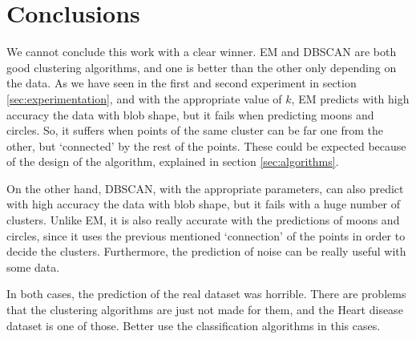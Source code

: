 \section{Conclusions}
We cannot conclude this work with a clear winner. EM and DBSCAN are both good clustering algorithms, and one is better than the other only depending on the data. 
As we have seen in the first and second experiment in section \ref{sec:experimentation}, and with the appropriate value of $k$, EM predicts with high accuracy the data with blob shape, but it fails when predicting moons and circles. So, it suffers when points of the same cluster can be far one from the other, but `connected' by the rest of the points. 
\cleardoublepage These could be expected because of the design of the algorithm, explained in section \ref{sec:algorithms}.

On the other hand, DBSCAN, with the appropriate parameters, can also predict with high accuracy the data with blob shape, but it fails with a huge number of clusters. Unlike EM, it is also really accurate with the predictions of moons and circles, since it uses the previous mentioned `connection' of the points in order to decide the clusters. Furthermore, the prediction of noise can be really useful with some data.

In both cases, the prediction of the real dataset was horrible. There are problems that the clustering algorithms are just not made for them, and the Heart disease dataset is one of those. Better use the classification algorithms in this cases.